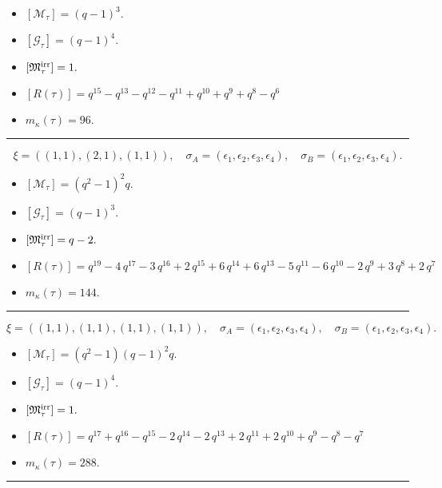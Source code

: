 \documentclass[10pt,a4paper]{amsart}
\begin{document}
\begin{itemize}
 \item $[\mathcal{M}_{\tau}] = {\left(q - 1\right)}^{3} .$

 \item $[\mathcal{G}_{\tau}] = {\left(q - 1\right)}^{4} .$

 \item $[{\frak M}_{\tau}^{\textrm{irr}}] = 1 .$

 \item $[R(\tau)] = q^{15} - q^{13} - q^{12} - q^{11} + q^{10} + q^{9} + q^{8} - q^{6} $

 \item $m_{\kappa}(\tau) = 96 .$

 \end{itemize}
\noindent\rule{8cm}{0.4pt}

$$\xi = ({(1, 1)}, {(2, 1)}, {(1, 1)}),\quad \sigma_A = ({{\epsilon_1}}, {{\epsilon_2, \epsilon_3}}, {{\epsilon_4}}),\quad \sigma_B = ({{\epsilon_1}}, {{\epsilon_2, \epsilon_3}}, {{\epsilon_4}}).$$

\begin{itemize}
 \item $[\mathcal{M}_{\tau}] = {\left(q^{2} - 1\right)}^{2} q .$

 \item $[\mathcal{G}_{\tau}] = {\left(q - 1\right)}^{3} .$

 \item $[{\frak M}_{\tau}^{\textrm{irr}}] = q - 2 .$

 \item $[R(\tau)] = q^{19} - 4 \, q^{17} - 3 \, q^{16} + 2 \, q^{15} + 6 \, q^{14} + 6 \, q^{13} - 5 \, q^{11} - 6 \, q^{10} - 2 \, q^{9} + 3 \, q^{8} + 2 \, q^{7} $

 \item $m_{\kappa}(\tau) = 144 .$

 \end{itemize}
\noindent\rule{8cm}{0.4pt}

$$\xi = ({(1, 1)}, {(1, 1), (1, 1)}, {(1, 1)}),\quad \sigma_A = ({{\epsilon_1}}, {{\epsilon_2}, {\epsilon_3}}, {{\epsilon_4}}),\quad \sigma_B = ({{\epsilon_1}}, {{\epsilon_2}, {\epsilon_3}}, {{\epsilon_4}}).$$

\begin{itemize}
 \item $[\mathcal{M}_{\tau}] = {\left(q^{2} - 1\right)} {\left(q - 1\right)}^{2} q .$

 \item $[\mathcal{G}_{\tau}] = {\left(q - 1\right)}^{4} .$

 \item $[{\frak M}_{\tau}^{\textrm{irr}}] = 1 .$

 \item $[R(\tau)] = q^{17} + q^{16} - q^{15} - 2 \, q^{14} - 2 \, q^{13} + 2 \, q^{11} + 2 \, q^{10} + q^{9} - q^{8} - q^{7} $

 \item $m_{\kappa}(\tau) = 288 .$

 \end{itemize}
\noindent\rule{8cm}{0.4pt}
\end{document}
